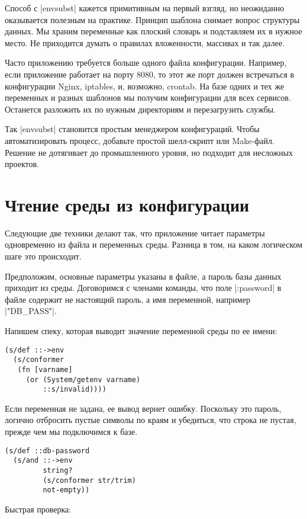 Способ с \spverb|envsubst| кажется примитивным на первый взгляд, но неожиданно
оказывается полезным на практике. Принцип шаблона снимает вопрос структуры
данных. Мы храним переменные как плоский словарь и подставляем их в нужное
место. Не приходится думать о правилах вложенности, массивах и так далее.

Часто приложению требуется больше одного файла конфигурации. Например, если
приложение работает на порту 8080, то этот же порт должен встречаться в
конфигурации Nginx, iptables, и, возможно, crontab. На базе одних и тех же
переменных и разных шаблонов мы получим конфигурации для всех
сервисов. Останется разложить их по нужным директориям и перезагрузить службы.

Так \spverb|envsubst| становится простым менеджером конфигураций. Чтобы
автоматизировать процесс, добавьте простой шелл-скрипт или Make-файл. Решение не
дотягивает до промышленного уровня, но подходит для несложных проектов.

\section{Чтение среды из конфигурации}

Следующие две техники делают так, что приложение читает параметры одновременно
из файла и переменных среды. Разница в том, на каком логическом шаге это
происходит.

Предположим, основные параметры указаны в файле, а пароль базы данных приходит
из среды. Договоримся с членами команды, что поле \spverb|:password| в файле содержит не
настоящий пароль, а имя переменной, например \spverb|"DB_PASS"|.

Напишем спеку, которая выводит значение переменной среды по ее имени:

\begin{verbatim}
(s/def ::->env
  (s/conformer
   (fn [varname]
     (or (System/getenv varname)
         ::s/invalid))))
\end{verbatim}

Если переменная не задана, ее вывод вернет ошибку. Поскольку это пароль, логично
отбросить пустые символы по краям и убедиться, что строка не пустая, прежде чем
мы подключимся к базе.

\begin{verbatim}
(s/def ::db-password
  (s/and ::->env
         string?
         (s/conformer str/trim)
         not-empty))
\end{verbatim}

Быстрая проверка:

